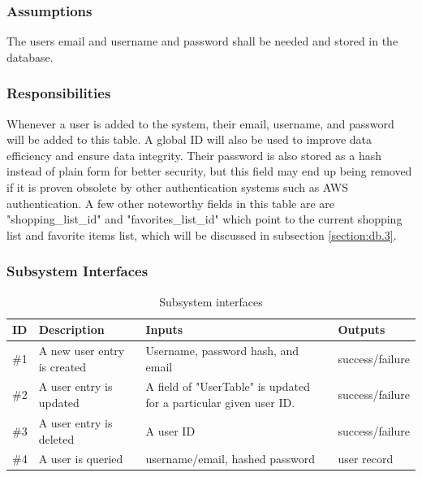 \subsubsection{Assumptions}
The users email and username and password shall be needed and stored in the database.

\subsubsection{Responsibilities}
Whenever a user is added to the system, their email, username, and password will be added to this table.  A global ID will also be used to improve data efficiency and ensure data integrity.  Their password is also stored as a hash instead of plain form for better security, but this field may end up being removed if it is proven obsolete by other authentication systems such as AWS authentication.  A few other noteworthy fields in this table are are "shopping\_list\_id" and "favorites\_list\_id" which point to the current shopping list and favorite items list, which will be discussed in subsection \ref{section:db.3}.


\subsubsection{Subsystem Interfaces}
\begin {table}[H]
\caption {Subsystem interfaces} 
\begin{center}
    \begin{tabular}{ | p{1cm} | p{6cm} | p{3cm} | p{3cm} |}
    \hline
    ID & Description & Inputs & Outputs \\ \hline
    \#1 & A new user entry is created & Username, password hash, and email & success/failure  \\ \hline
    \#2 & A user entry is updated & A field of "UserTable" is updated for a particular given user ID. & success/failure  \\ \hline
    \#3 & A user entry is deleted & A user ID & success/failure  \\ \hline
    \#4 & A user is queried & username/email, hashed password & user record  \\ \hline
    \end{tabular}
\end{center}
\end{table}


